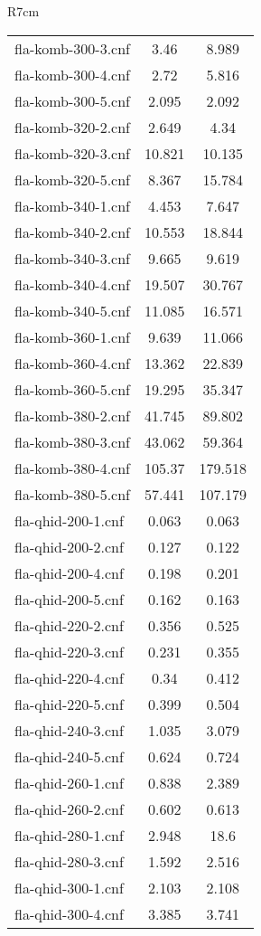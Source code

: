 \begin{wraptable}{R}{7cm}
\begin{tabular}{l| c c }
fla-komb-300-3.cnf & 3.46 & 8.989 \\
fla-komb-300-4.cnf & 2.72 & 5.816 \\
fla-komb-300-5.cnf & 2.095 & 2.092 \\
fla-komb-320-2.cnf & 2.649 & 4.34 \\
fla-komb-320-3.cnf & 10.821 & 10.135 \\
fla-komb-320-5.cnf & 8.367 & 15.784 \\
fla-komb-340-1.cnf & 4.453 & 7.647 \\
fla-komb-340-2.cnf & 10.553 & 18.844 \\
fla-komb-340-3.cnf & 9.665 & 9.619 \\
fla-komb-340-4.cnf & 19.507 & 30.767 \\
fla-komb-340-5.cnf & 11.085 & 16.571 \\
fla-komb-360-1.cnf & 9.639 & 11.066 \\
fla-komb-360-4.cnf & 13.362 & 22.839 \\
fla-komb-360-5.cnf & 19.295 & 35.347 \\
fla-komb-380-2.cnf & 41.745 & 89.802 \\
fla-komb-380-3.cnf & 43.062 & 59.364 \\
fla-komb-380-4.cnf & 105.37 & 179.518 \\
fla-komb-380-5.cnf & 57.441 & 107.179 \\
fla-qhid-200-1.cnf & 0.063 & 0.063 \\
fla-qhid-200-2.cnf & 0.127 & 0.122 \\
fla-qhid-200-4.cnf & 0.198 & 0.201 \\
fla-qhid-200-5.cnf & 0.162 & 0.163 \\
fla-qhid-220-2.cnf & 0.356 & 0.525 \\
fla-qhid-220-3.cnf & 0.231 & 0.355 \\
fla-qhid-220-4.cnf & 0.34 & 0.412 \\
fla-qhid-220-5.cnf & 0.399 & 0.504 \\
fla-qhid-240-3.cnf & 1.035 & 3.079 \\
fla-qhid-240-5.cnf & 0.624 & 0.724 \\
fla-qhid-260-1.cnf & 0.838 & 2.389 \\
fla-qhid-260-2.cnf & 0.602 & 0.613 \\
fla-qhid-280-1.cnf & 2.948 & 18.6 \\
fla-qhid-280-3.cnf & 1.592 & 2.516 \\
fla-qhid-300-1.cnf & 2.103 & 2.108 \\
fla-qhid-300-4.cnf & 3.385 & 3.741 \\

\end{tabular}
\end{wraptable}
